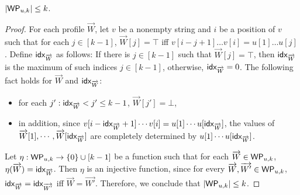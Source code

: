 
\begin{proposition}
$|\mathsf{WP}_{u,k}| \le k$.
\end{proposition}
%
\begin{proof}
For each profile $\overrightarrow{W}$, let $v$ be a nonempty string and $i$ be a position of $v$ such that for each $j \in [k-1]$, $\overrightarrow{W}[j] = \top$ iff $v[i-j+1] \dots v[i] = u[1] \dots u[j]$. Define ${\sf idx}_{\overrightarrow{W}}$ as follows: If there is $j \in [k-1]$ such that $\overrightarrow{W}[j]=\top$, then ${\sf idx}_{\overrightarrow{W}}$ is the maximum of such indices $j \in [k-1]$, otherwise, ${\sf idx}_{\overrightarrow{W}} =0$. The following fact holds for $\overrightarrow{W}$ and ${\sf idx}_{\overrightarrow{W}}$: 
\begin{itemize}
	\item for each $j': {\sf idx}_{\overrightarrow{W}} < j' \le k-1$, $\overrightarrow{W}[j']=\bot$,
	\item in addition, since $v[i-{\sf idx}_{\overrightarrow{W}}+1] \cdots v[i] = u[1] \cdots u[{\sf idx}_{\overrightarrow{W}}]$, the values of $\overrightarrow{W}[1],\cdots, \overrightarrow{W}[{\sf idx}_{\overrightarrow{W}}]$ are completely determined by $u[1] \cdots u[{\sf idx}_{\overrightarrow{W}}]$.
\end{itemize}
Let $\eta: \mathsf{WP}_{u, k} \rightarrow \{0\} \cup [k-1]$ be a function such that for each $\overrightarrow{W} \in \mathsf{WP}_{u,k}$, $\eta(\overrightarrow{W})={\sf idx}_{\overrightarrow{W}}$. Then $\eta$ is an injective function, since for every $\overrightarrow{W}, \overrightarrow{W'} \in \mathsf{WP}_{u, k}$, ${\sf idx}_{\overrightarrow{W}}  = {\sf idx}_{\overrightarrow{W'}}$ iff $\overrightarrow{W} = \overrightarrow{W'}$. Therefore, we conclude that  $ |\mathsf{WP}_{u, k}| \le k$.
\end{proof}

